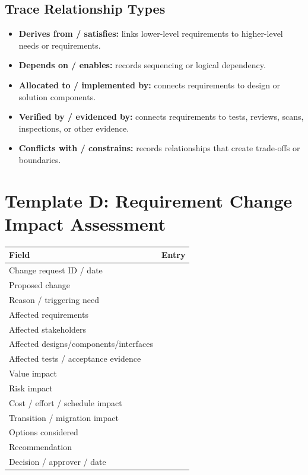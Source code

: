 \documentclass[11pt]{article}
\begin{document}
\subsection{Trace Relationship Types}
\begin{itemize}
\item \textbf{Derives from / satisfies:} links lower-level requirements to higher-level needs or requirements.
\item \textbf{Depends on / enables:} records sequencing or logical dependency.
\item \textbf{Allocated to / implemented by:} connects requirements to design or solution components.
\item \textbf{Verified by / evidenced by:} connects requirements to tests, reviews, scans, inspections, or other evidence.
\item \textbf{Conflicts with / constrains:} records relationships that create trade-offs or boundaries.
\end{itemize}
\section{Template D: Requirement Change Impact Assessment}
\begin{longtable}{L{0.28\textwidth} L{0.60\textwidth}}
\toprule
Field & Entry\\
\midrule
Change request ID / date & \\
Proposed change & \vspace{0.25in}\\
Reason / triggering need & \vspace{0.20in}\\
Affected requirements & \\
Affected stakeholders & \\
Affected designs/components/interfaces & \vspace{0.20in}\\
Affected tests / acceptance evidence & \vspace{0.20in}\\
Value impact & \vspace{0.18in}\\
Risk impact & \vspace{0.18in}\\
Cost / effort / schedule impact & \vspace{0.18in}\\
Transition / migration impact & \vspace{0.18in}\\
Options considered & \vspace{0.22in}\\
Recommendation & \vspace{0.22in}\\
Decision / approver / date & \vspace{0.18in}\\
\bottomrule
\end{longtable}
\end{document}
